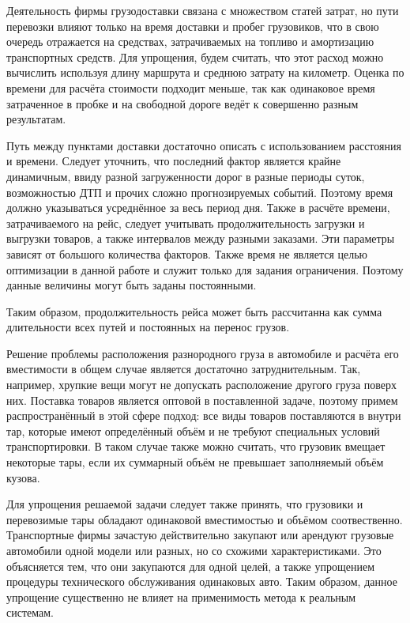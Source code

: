 	Деятельность фирмы грузодоставки связана с множеством статей затрат, но пути перевозки влияют только на время доставки и пробег грузовиков, что в свою очередь отражается на средствах, затрачиваемых на топливо и амортизацию транспортных средств. Для упрощения, будем считать, что этот расход можно вычислить используя длину маршрута и среднюю затрату на километр. Оценка по времени для расчёта стоимости подходит меньше, так как одинаковое время затраченное в пробке и на свободной дороге ведёт к совершенно разным результатам.
	
	Путь между пунктами доставки достаточно описать с использованием расстояния и времени. Следует уточнить, что последний фактор является крайне динамичным, ввиду разной загруженности дорог в разные периоды суток, возможностью ДТП и прочих сложно прогнозируемых событий. Поэтому время должно указываться  усреднённое за весь период дня. Также в расчёте времени, затрачиваемого на рейс, следует учитывать продолжительность загрузки и выгрузки товаров, а также интервалов между разными заказами. Эти параметры зависят от большого количества факторов. Также время не является целью оптимизации в данной работе и служит только для задания ограничения. Поэтому данные величины могут быть заданы постоянными.
	
	Таким образом, продолжительность рейса может быть рассчитанна как сумма длительности всех путей и постоянных на перенос грузов.
	
	Решение проблемы расположения разнородного груза в автомобиле и расчёта его вместимости в общем случае является достаточно затруднительным. Так, например, хрупкие вещи могут не допускать расположение другого груза поверх них. Поставка товаров является оптовой в поставленной задаче, поэтому примем распространённый в этой сфере подход: все виды товаров поставляются в внутри тар, которые имеют определённый объём и не требуют специальных условий транспортировки. В таком случае также можно считать, что грузовик вмещает некоторые тары, если их суммарный объём не превышает заполняемый объём кузова.
	
	Для упрощения решаемой задачи следует также принять, что грузовики и перевозимые тары обладают одинаковой вместимостью и объёмом соотвественно. Транспортные фирмы зачастую действительно закупают или арендуют грузовые автомобили одной модели или разных, но со схожими характеристиками. Это объясняется тем, что они закупаются для одной целей, а также упрощением процедуры технического обслуживания одинаковых авто. Таким образом, данное упрощение существенно не влияет на применимость метода к реальным системам.
	
